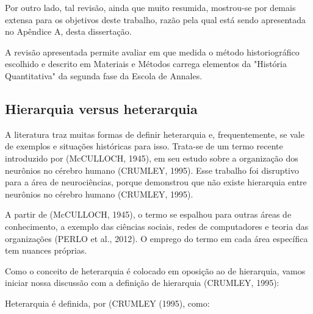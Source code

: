 Por outro lado, tal revisão, ainda que muito resumida, mostrou-se por demais extensa para os objetivos deste trabalho, razão pela qual está sendo apresentada no Apêndice A, desta dissertação.

A revisão apresentada permite avaliar em que medida o método historiográfico escolhido e descrito em Materiais e Métodos carrega elementos da "História Quantitativa" da segunda fase da Escola de Annales.

\subsection[Hierarquia versus heterarquia]{Hierarquia versus heterarquia}\label{Hierarquia versus heterarquia}
A literatura traz muitas formas de definir heterarquia e, frequentemente, se vale de exemplos e situações históricas para isso. Trata-se de um termo  recente introduzido  por (McCULLOCH, 1945), em seu estudo sobre a organização dos neurônios no cérebro humano (CRUMLEY, 1995). Esse trabalho foi disruptivo para a área de neurociências, porque demonstrou que não existe hierarquia entre neurônios no cérebro humano  (CRUMLEY, 1995).

A partir de (McCULLOCH, 1945), o termo se espalhou para outras áreas de conhecimento, a exemplo das ciências sociais, redes de computadores e teoria das organizações (PERLO et al., 2012). O emprego do termo em cada área específica tem nuances próprias.

Como o conceito de heterarquia é colocado em oposição ao de hierarquia, vamos iniciar nossa discussão com a definição de hierarquia (CRUMLEY, 1995):


\noindent\begin{flushright}\mbox{\linespread{1}\selectfont\centering{}}\end{flushright}


Heterarquia é definida, por (CRUMLEY (1995), como:


\noindent\begin{flushright}\mbox{\linespread{1}\selectfont\centering{}}\end{flushright}


